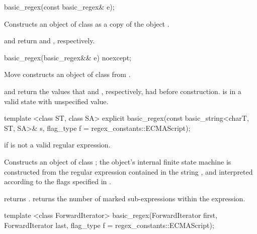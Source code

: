 %
\begin{itemdecl}
basic_regex(const basic_regex& e); 
\end{itemdecl}

\begin{itemdescr}
\pnum
\effects  Constructs an object of class  as a copy of
the object .

\pnum\postconditions
{} and  return 
 and , respectively.
\end{itemdescr}

%
\begin{itemdecl}
basic_regex(basic_regex&& e) noexcept;
\end{itemdecl}

\begin{itemdescr}
\pnum
\effects  Move constructs an object of class  from .

\pnum
\postconditions {} and  return the values that
 and , respectively, had before construction.
 is in a valid state with unspecified value.
\end{itemdescr}

%
\begin{itemdecl}
template <class ST, class SA>
  explicit basic_regex(const basic_string<charT, ST, SA>& s,
                       flag_type f = regex_constants::ECMAScript);
\end{itemdecl}

\begin{itemdescr}
\pnum
\throws  {} if  is not a valid regular expression. 

\pnum
\effects  Constructs an object of class ; the object's
internal finite state machine is constructed from the regular
expression contained in the string , and interpreted according to the
flags specified in .

\pnum\postconditions
{} returns .  
 returns the number of marked sub-expressions
within the expression.
\end{itemdescr}

%
\begin{itemdecl}
template <class ForwardIterator>
  basic_regex(ForwardIterator first, ForwardIterator last,
              flag_type f = regex_constants::ECMAScript);
\end{itemdecl}

